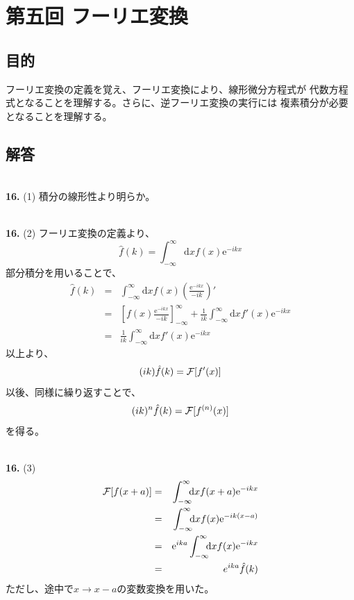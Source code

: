 \documentclass{jarticle}
\newcommand{\diff}{\mathrm d}
\newcommand{\ans}[2]{\noindent\\ {\bf \large #1.} (#2)}
\newcommand{\e}{\mathrm e}
\begin{document}
\newpage
\section{第五回 フーリエ変換}

\subsection{目的}
フーリエ変換の定義を覚え、フーリエ変換により、線形微分方程式が
代数方程式となることを理解する。さらに、逆フーリエ変換の実行には
複素積分が必要となることを理解する。

\subsection{解答}

\ans{16}{1}
積分の線形性より明らか。

\ans{16}{2}
フーリエ変換の定義より、
\begin{equation}
  \hat{f}(k) = \int_{-\infty}^{\infty} \!\!\! \diff x f(x) \e^{-ikx}
\end{equation}
部分積分を用いることで、
\begin{eqnarray}
  \hat{f}(k) &=& \int_{-\infty}^{\infty} \!\!\! \diff x f(x) \left( \frac{\e^{-ikx}}{-ik}\right)'\\
  &=&
  \left[
    f(x)  \frac{\e^{-ikx}}{-ik}
    \right]_{-\infty}^{\infty}
  + \frac{1}{ik}\int_{-\infty}^{\infty} \!\!\! \diff x f'(x) \e^{-ikx}\\
  &=& \frac{1}{ik}\int_{-\infty}^{\infty} \!\!\! \diff x f'(x) \e^{-ikx}
\end{eqnarray}
以上より、
\begin{equation}
  (ik) \hat{f}(k) = {\cal F}[f'(x)]
\end{equation}
以後、同様に繰り返すことで、
\begin{equation}
  (ik)^n \hat{f}(k) = {\cal F}[f^{(n)}(x)]
\end{equation}
を得る。

\ans{16}{3}
\begin{eqnarray}
  {\cal F}[f(x+a)] &=& \int_{-\infty}^{\infty} \!\!\! \diff x f(x+a) \e^{-ikx}\\
  &=& \int_{-\infty}^{\infty} \!\!\! \diff x f(x) \e^{-ik(x-a)}\\
  &=& \e^{ika} \int_{-\infty}^{\infty} \!\!\! \diff x f(x) \e^{-ikx}\\
  &=& e^{ika} \hat{f}(k)
\end{eqnarray}
ただし、途中で$x \rightarrow x-a$の変数変換を用いた。
\end{document}
